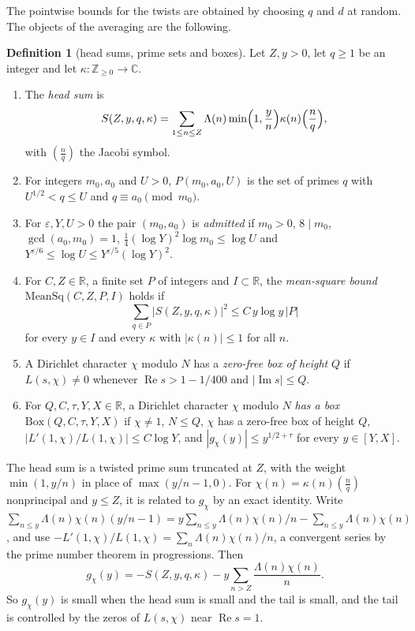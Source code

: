 \documentclass[11pt]{amsbook}
\theoremstyle{plain}
\theoremstyle{definition}
\newtheorem{definition}[theorem]{Definition}
\theoremstyle{remark}
\numberwithin{equation}{section}
\numberwithin{figure}{chapter}
\numberwithin{table}{chapter}
\newcommand{\Z}{\mathbb{Z}}
\newcommand{\R}{\mathbb{R}}
\renewcommand{\C}{\mathbb{C}}
\newcommand{\eps}{\varepsilon}
\begin{document}
The pointwise bounds for the twists are obtained by choosing $q$ and
$d$ at random. The objects of the averaging are the following.

\begin{definition}[head sums, prime sets and boxes]\label{def:headsum}
Let $Z,y>0$, let $q\ge1$ be an integer and let
$\kappa\colon\Z_{\ge0}\to\C$.
\begin{enumerate}[label=(\arabic*)]
\item The \emph{head sum} is
\[
S(Z,y,q,\kappa)=\sum_{1\le n\le Z}\Lambda(n)\min\Bigl(1,\frac yn
\Bigr)\kappa(n)\Bigl(\frac nq\Bigr),
\]
with $(\frac nq)$ the Jacobi symbol.
\item For integers $m_0,a_0$ and $U>0$, $P(m_0,a_0,U)$ is the set of
primes $q$ with $U^{1/2}<q\le U$ and $q\equiv a_0\pmod{m_0}$.
\item For $\eps,Y,U>0$ the pair $(m_0,a_0)$ is \emph{admitted} if
$m_0>0$, $8\mid m_0$, $\gcd(a_0,m_0)=1$,
$\frac14(\log Y)^2\log m_0\le\log U$ and
$Y^{\eps/6}\le\log U\le Y^{\eps/5}(\log Y)^2$.
\item For $C,Z\in\R$, a finite set $P$ of integers and $I\subset\R$,
the \emph{mean-square bound} $\mathrm{MeanSq}(C,Z,P,I)$ holds if
\[
\sum_{q\in P}|S(Z,y,q,\kappa)|^2\le C\,y\log y\,|P|
\]
for every $y\in I$ and every $\kappa$ with $|\kappa(n)|\le1$ for all
$n$.
\item A Dirichlet character $\chi$ modulo $N$ has a \emph{zero-free
box of height} $Q$ if $L(s,\chi)\ne0$ whenever
$\operatorname{Re}s>1-1/400$ and $|\operatorname{Im}s|\le Q$.
\item For $Q,C,\tau,Y,X\in\R$, a Dirichlet character $\chi$ modulo $N$
\emph{has a box} $\mathrm{Box}(Q,C,\tau,Y,X)$ if $\chi\ne1$, $N\le
Q$, $\chi$ has a zero-free box of height $Q$,
$|L'(1,\chi)/L(1,\chi)|\le C\log Y$, and $|g_\chi(y)|\le
y^{1/2+\tau}$ for every $y\in[Y,X]$.
\end{enumerate}
\end{definition}

The head sum is a twisted prime sum truncated at $Z$, with the weight
$\min(1,y/n)$ in place of $\max(y/n-1,0)$. For $\chi(n)=\kappa(n)
(\frac nq)$ nonprincipal and $y\le Z$, it is related to $g_\chi$ by
an exact identity. Write $\sum_{n\le y}\Lambda(n)\chi(n)(y/n-1)=
y\sum_{n\le y}\Lambda(n)\chi(n)/n-\sum_{n\le y}\Lambda(n)\chi(n)$,
and use $-L'(1,\chi)/L(1,\chi)=\sum_n\Lambda(n)\chi(n)/n$, a
convergent series by the prime number theorem in progressions. Then
\begin{equation}\label{eq:head-tail}
g_\chi(y)=-S(Z,y,q,\kappa)-y\sum_{n>Z}\frac{\Lambda(n)\chi(n)}{n}.
\end{equation}
So $g_\chi(y)$ is small when the head sum is small and the tail is
small, and the tail is controlled by the zeros of $L(s,\chi)$ near
$\operatorname{Re}s=1$.
\end{document}
